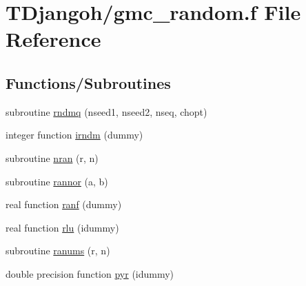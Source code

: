 \hypertarget{gmc__random_8f}{\section{T\+Djangoh/gmc\+\_\+random.f File Reference}
\label{gmc__random_8f}
}
\subsection*{Functions/\+Subroutines}
\begin{DoxyCompactItemize}
\item 
subroutine \hyperlink{gmc__random_8f_a9f7e299636d9aa908be5751ad6cc3b3f}{rndmq} (nseed1, nseed2, nseq, chopt)
\item 
integer function \hyperlink{gmc__random_8f_a45e4beabe1a9d7d06f7e8dd11de2bb40}{irndm} (dummy)
\item 
subroutine \hyperlink{gmc__random_8f_a7b1dcdac0dcede17363f3378f1d37760}{nran} (r, n)
\item 
subroutine \hyperlink{gmc__random_8f_a3da8efd8c2842ba8d47569f6bec2e989}{rannor} (a, b)
\item 
real function \hyperlink{gmc__random_8f_a1b59c2860c681ba2938e38284ff3ae3d}{ranf} (dummy)
\item 
real function \hyperlink{gmc__random_8f_acbbdf0219bb77063d42c5ead04a95992}{rlu} (idummy)
\item 
subroutine \hyperlink{gmc__random_8f_a2257c5764d872d6d6d31f0266aa08635}{ranums} (r, n)
\item 
double precision function \hyperlink{gmc__random_8f_adc1905efb1ff6d967d69f6823feb5e92}{pyr} (idummy)
\end{DoxyCompactItemize}


